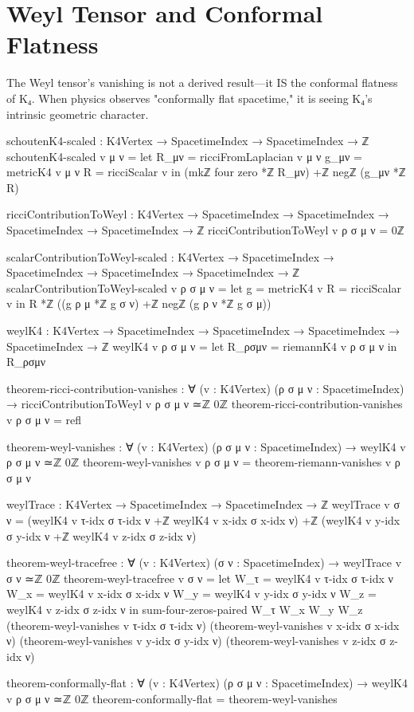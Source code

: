 \documentclass[11pt,a4paper]{book}
\begin{document}
\section{Weyl Tensor and Conformal Flatness}

The Weyl tensor's vanishing is not a derived result—it IS the conformal flatness of K₄. When physics observes "conformally flat spacetime," it is seeing K₄'s intrinsic geometric character.

\begin{code}
schoutenK4-scaled : K4Vertex → SpacetimeIndex → SpacetimeIndex → ℤ
schoutenK4-scaled v μ ν = 
  let R_μν = ricciFromLaplacian v μ ν
      g_μν = metricK4 v μ ν
      R    = ricciScalar v
  in (mkℤ four zero *ℤ R_μν) +ℤ negℤ (g_μν *ℤ R)

ricciContributionToWeyl : K4Vertex → SpacetimeIndex → SpacetimeIndex → 
                          SpacetimeIndex → SpacetimeIndex → ℤ
ricciContributionToWeyl v ρ σ μ ν = 0ℤ

scalarContributionToWeyl-scaled : K4Vertex → SpacetimeIndex → SpacetimeIndex → 
                                   SpacetimeIndex → SpacetimeIndex → ℤ
scalarContributionToWeyl-scaled v ρ σ μ ν =
  let g = metricK4 v
      R = ricciScalar v
  in R *ℤ ((g ρ μ *ℤ g σ ν) +ℤ negℤ (g ρ ν *ℤ g σ μ))

weylK4 : K4Vertex → SpacetimeIndex → SpacetimeIndex → 
         SpacetimeIndex → SpacetimeIndex → ℤ
weylK4 v ρ σ μ ν = 
  let R_ρσμν = riemannK4 v ρ σ μ ν
  in R_ρσμν

theorem-ricci-contribution-vanishes : ∀ (v : K4Vertex) (ρ σ μ ν : SpacetimeIndex) →
  ricciContributionToWeyl v ρ σ μ ν ≃ℤ 0ℤ
theorem-ricci-contribution-vanishes v ρ σ μ ν = refl

theorem-weyl-vanishes : ∀ (v : K4Vertex) (ρ σ μ ν : SpacetimeIndex) →
                         weylK4 v ρ σ μ ν ≃ℤ 0ℤ
theorem-weyl-vanishes v ρ σ μ ν = theorem-riemann-vanishes v ρ σ μ ν

weylTrace : K4Vertex → SpacetimeIndex → SpacetimeIndex → ℤ
weylTrace v σ ν = 
  (weylK4 v τ-idx σ τ-idx ν +ℤ weylK4 v x-idx σ x-idx ν) +ℤ
  (weylK4 v y-idx σ y-idx ν +ℤ weylK4 v z-idx σ z-idx ν)

theorem-weyl-tracefree : ∀ (v : K4Vertex) (σ ν : SpacetimeIndex) →
                          weylTrace v σ ν ≃ℤ 0ℤ
theorem-weyl-tracefree v σ ν = 
  let W_τ = weylK4 v τ-idx σ τ-idx ν
      W_x = weylK4 v x-idx σ x-idx ν
      W_y = weylK4 v y-idx σ y-idx ν
      W_z = weylK4 v z-idx σ z-idx ν
  in sum-four-zeros-paired W_τ W_x W_y W_z
       (theorem-weyl-vanishes v τ-idx σ τ-idx ν)
       (theorem-weyl-vanishes v x-idx σ x-idx ν)
       (theorem-weyl-vanishes v y-idx σ y-idx ν)
       (theorem-weyl-vanishes v z-idx σ z-idx ν)

theorem-conformally-flat : ∀ (v : K4Vertex) (ρ σ μ ν : SpacetimeIndex) →
  weylK4 v ρ σ μ ν ≃ℤ 0ℤ
theorem-conformally-flat = theorem-weyl-vanishes
\end{code}
\end{document}
